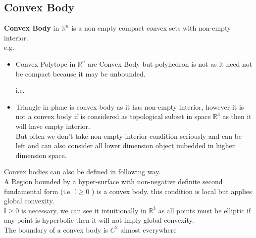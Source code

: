 \documentclass[oneside]{book}
\newtheorem{mydef}{Definition}
\begin{document}
\begin{comment}
\begin{mydef}
A function $f: \mathbb{R}^{n} \rightarrow(-\infty, \infty]$ is \textbf{positively homogeneous} of degree 1 if
$$
f(\alpha x)=\alpha f(x), \quad \text { for all } x \in \mathbb{R}^{n}, \alpha \geq 0
$$
$f$ is convex if and only if it is subadditive, given  $f$ is positively homogeneous  as
$$
 f(x+y) \leq f(x)+f(y)  \text{and }f(\alpha x)=\alpha f(x) $$,
  \quad \text { for all } R$ gives definition of convex function
\end{mydef}
\end{comment}
 \subsection{Convex Body}
 
\textbf{Convex Body } in  $\mathbb{R}^n$  is a non empty compact convex sets with non-empty interior.\\
e.g.\\
\begin{itemize}
    \item   Convex Polytope in $\mathbb{R}^n$ are Convex Body but polyhedron is not as it need not be compact because it may be unbounded. 
    
    i.e.\\
    
    \item 
Triangle in plane is convex body as it has non-empty interior, however it is not a convex body if is considered as topological subset in space  $\mathbb{R}^3$ as then it will have  empty interior. 
\\  
But often we don't take non-empty interior condition seriously and can be left and can also consider all lower dimension object imbedded in higher dimension space.
\end{itemize}
 
Convex bodies can also be defined in following way.\\
     A Region  bounded by a hyper-surface with non-negative definite second fundamental form (i.e. $\mathbb{I} \geq 0 $ ) is a convex body. this condition is local but  applies global convexity. \\
     $\mathbb{I} \geq 0 $ is necessary, we can see it intuitionally in  $\mathbb{R}^3$ as all points must be elliptic if any point is hyperbolic then it will not imply global convexity. \\
     The boundary of a convex body is $C^{2}$ almost everywhere   \\\\
     
\end{document}
